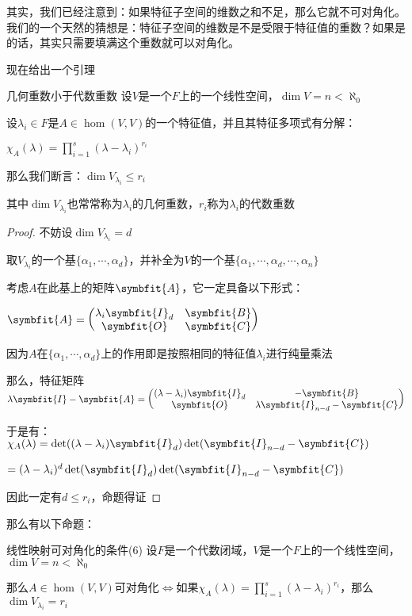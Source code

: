 \documentclass[12pt, a4paper, oneside, UTF8]{ctexbook}
\begin{document}
			其实，我们已经注意到：如果特征子空间的维数之和不足，那么它就不可对角化。我们的一个天然的猜想是：特征子空间的维数是不是受限于特征值的重数？如果是的话，其实只需要填满这个重数就可以对角化。

			现在给出一个引理
			\begin{lemma}{几何重数小于代数重数}{}
				设$V$是一个$F$上的一个线性空间，$\dim V = n < \aleph_0$

				设$\lambda_i \in F$是$A \in \hom(V,V)$的一个特征值，并且其特征多项式有分解：

				$\chi_A(\lambda )=\prod\limits_{i=1}^{s} (\lambda-\lambda_i)^{r_i}$

				那么我们断言：$\dim V_{\lambda_i} \leqslant r_i$

				其中$\dim V_{\lambda_i}$也常常称为$\lambda_i$的几何重数，$r_i$称为$\lambda_i$的代数重数
			\end{lemma}
			\begin{proof}
				不妨设$\dim V_{\lambda_i}=d$

				取$V_{\lambda_i}$的一个基$\{\alpha_1,\cdots,\alpha_d\}$，并补全为$V$的一个基$\{\alpha_1,\cdots,\alpha_d,\cdots,\alpha_n\}$

				考虑$A$在此基上的矩阵$\symbfit{A}$，它一定具备以下形式：

				$\symbfit{A}=\begin{pmatrix}
					\lambda_i \symbfit{I}_d & \symbfit{B} \\
					\symbfit{O} & \symbfit{C}
				\end{pmatrix}$

				因为$A$在$\{\alpha_1,\cdots,\alpha_d\}$上的作用即是按照相同的特征值$\lambda_i$进行纯量乘法

				那么，特征矩阵$\lambda\symbfit{I}-\symbfit{A}=\begin{pmatrix}
					(\lambda -\lambda_i) \symbfit{I}_d & -\symbfit{B} \\
					\symbfit{O} & \lambda \symbfit{I}_{n-d}-\symbfit{C}\end{pmatrix}$

				于是有：$\chi_A(\lambda )=\det((\lambda -\lambda_i) \symbfit{I}_d)\det(\symbfit{I}_{n-d}-\symbfit{C})$

				$=(\lambda -\lambda_i)^d\det( \symbfit{I}_d)\det(\symbfit{I}_{n-d}-\symbfit{C})$

				因此一定有$d\leqslant r_i$，命题得证
			\end{proof}
			那么有以下命题：
			\begin{them}{线性映射可对角化的条件(6)}{}
				设$F$是一个代数闭域，$V$是一个$F$上的一个线性空间，$\dim V = n < \aleph_0$

				那么$A \in \hom(V,V)$可对角化$\Leftrightarrow$如果$\chi_A(\lambda)=\prod\limits_{i=1}^{s} (\lambda -\lambda_i)^{r_i} $，那么$\dim V_{\lambda_i}=r_i$
			\end{them}
\end{document}
